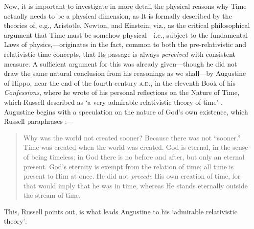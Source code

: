 Now, it is important to investigate in more detail the physical reasons why Time actually needs to be a physical dimension, as It is formally described by the theories of, e.g., Aristotle, Newton, and Einstein; viz., as the critical philosophical argument that Time must be somehow physical---i.e., subject to the fundamental Laws of physics,---originates in the fact, common to both the pre-relativistic and relativistic time concepts, that Its passage is always \textit{perceived} with consistent measure. A sufficient argument for this was already given---though he did not draw the same natural conclusion from his reasonings as we shall---by Augustine of Hippo, near the end of the fourth century \textsc{a.d.}, in the eleventh Book of his \textit{Confessions}, where he wrote of his personal reflections on the Nature of Time, which Russell described as `a very admirable relativistic theory of time' \cite{Russell1946}. Augustine begins with a speculation on the nature of God's own existence, which Russell paraphrases \cite{Russell1946}:---
\begin{quotation}
Why was the world not created sooner? Because there was not ``sooner.'' Time was created when the world was created. God is eternal, in the sense of being timeless; in God there is no before and after, but only an eternal present. God's eternity is exempt from the relation of time; all time is present to Him at once. He did not \textit{precede} His own creation of time, for that would imply that he was in time, whereas He stands eternally outside the stream of time.
\end{quotation}
This, Russell points out, is what leads Augustine to his `admirable relativistic theory':
